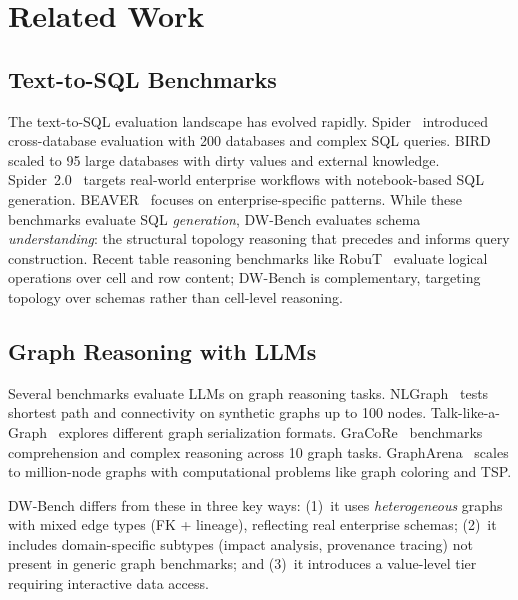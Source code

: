 \section{Related Work}
\label{sec:related}

\subsection{Text-to-SQL Benchmarks}

The text-to-SQL evaluation landscape has evolved rapidly.
Spider~\cite{yu2018spider} introduced cross-database evaluation with
200 databases and complex SQL queries.  BIRD~\cite{li2023bird} scaled
to 95 large databases with dirty values and external knowledge.
Spider~2.0~\cite{lei2024spider2} targets real-world enterprise workflows
with notebook-based SQL generation.  BEAVER~\cite{beaver2024} focuses
on enterprise-specific patterns.  While these benchmarks evaluate SQL
\emph{generation}, DW-Bench evaluates schema \emph{understanding}: the
structural topology reasoning that precedes and informs query construction.
Recent table reasoning benchmarks like RobuT~\cite{zhao2023robust} evaluate
logical operations over cell and row content; DW-Bench is complementary,
targeting topology over schemas rather than cell-level reasoning.

\subsection{Graph Reasoning with LLMs}

Several benchmarks evaluate LLMs on graph reasoning tasks.
NLGraph~\cite{wang2023nlgraph} tests shortest path and connectivity
on synthetic graphs up to 100 nodes.
Talk-like-a-Graph~\cite{fatemi2023talk} explores different graph
serialization formats.
GraCoRe~\cite{gracore2024} benchmarks comprehension and complex reasoning
across 10 graph tasks.
GraphArena~\cite{grapharena2024} scales to million-node graphs with
computational problems like graph coloring and TSP.

DW-Bench differs from these in three key ways: (1)~it uses
\emph{heterogeneous} graphs with mixed edge types (FK + lineage),
reflecting real enterprise schemas; (2)~it includes domain-specific
subtypes (impact analysis, provenance tracing) not present in generic
graph benchmarks; and (3)~it introduces a value-level tier requiring
interactive data access.

